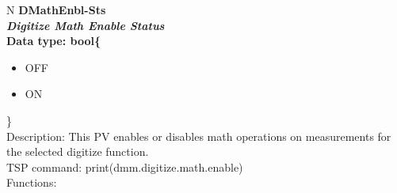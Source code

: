 \documentclass[openany]{article}
\begin{document}
		\begin{tabular}{N}
			\hline
			\bfseries DMathEnbl-Sts\label{pv:dmathenbl-sts} \\ \hline
			\emph{Digitize Math Enable Status} \\
			Data type: bool\{\begin{itemize}[noitemsep]
				\small
				\item[] OFF
				\item[] ON
			\end{itemize}\} \\
			Description: This PV enables or disables math operations on measurements for the selected digitize function. \\
			TSP command: print(dmm.digitize.math.enable) \\
			Functions: \\
			\arrayrulecolor{\FuncTableBorderColor}

		\end{tabular}
\end{document}
